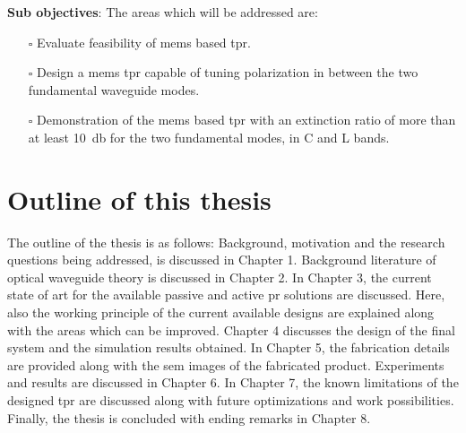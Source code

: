 \documentclass[../report.tex]{subfiles}
\begin{document}
\noindent \textbf{Sub objectives}: The areas which will be addressed are:
\begin{itemize}	
	\item[$\square$] Evaluate feasibility of \gls{mems} based \gls{tpr}. 
	\item[$\square$] Design a \gls{mems} \gls{tpr} capable of tuning polarization in between the two fundamental waveguide modes.
	\item[$\square$] Demonstration of the \gls{mems} based \gls{tpr} with an extinction ratio of more than at least \SI{10}{\decibel} for the two fundamental modes, in C and L bands.
\end{itemize}
	
	\section{Outline of this thesis}
The outline of the thesis is as follows: Background, motivation and the research questions being addressed, is discussed in Chapter 1. Background literature of optical waveguide theory is discussed in Chapter 2. In Chapter 3, the current state of art for the available passive and active \gls{pr} solutions are discussed. Here, also the working principle of the current available designs are explained along with the areas which can be improved. Chapter 4 discusses the design of the final system and the simulation results obtained. In Chapter 5, the fabrication details are provided along with the \gls{sem} images of the fabricated product. Experiments and results are discussed in Chapter 6. In Chapter 7, the known limitations of the designed \gls{tpr} are discussed along with future optimizations and work possibilities. Finally, the thesis is concluded with ending remarks in Chapter 8.
	
\end{document}
